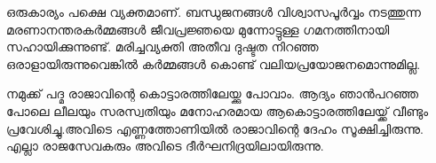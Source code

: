 ഒരുകാര്യം പക്ഷെ വ്യക്തമാണ്‌. ബന്ധുജനങ്ങള്‍ വിശ്വാസപൂര്‍വ്വം നടത്തുന്ന മരണാനന്തരകര്‍മ്മങ്ങള്‍ ജീവപ്രജ്ഞയെ മുന്നോട്ടുള്ള ഗമനത്തിനായി സഹായിക്കുന്നുണ്ട്‌. മരിച്ചവ്യക്തി അതീവ ദുഷ്ടത നിറഞ്ഞ ഒരാളായിരുന്നുവെങ്കില്‍ കര്‍മ്മങ്ങള്‍ കൊണ്ട്‌ വലിയപ്രയോജനമൊന്നുമില്ല. 

നമുക്ക്‌ പദ്മ രാജാവിന്റെ കൊട്ടാരത്തിലേയ്ക്കു പോവാം. ആദ്യം ഞാന്‍പറഞ്ഞ പോലെ ലീലയും സരസ്വതിയും മനോഹരമായ ആകൊട്ടാരത്തിലേയ്ക്ക്‌ വീണ്ടും പ്രവേശിച്ചു.അവിടെ എണ്ണത്തോണിയില്‍ രാജാവിന്റെ ദേഹം സൂക്ഷിച്ചിരുന്നു. എല്ലാ രാജസേവകരും അവിടെ ദീര്‍ഘനിദ്രയിലായിരുന്നു. 

